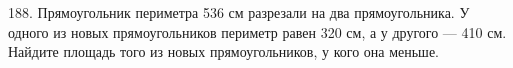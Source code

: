 188. Прямоугольник периметра 536 см разрезали на два прямоугольника. У одного из новых прямоугольников периметр равен 320 см, а у другого --- 410 см. Найдите площадь того из новых прямоугольников, у кого она меньше.\\
